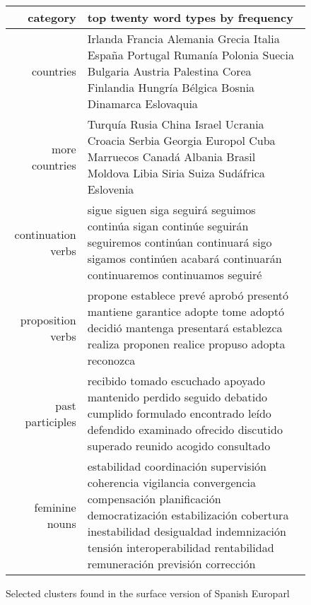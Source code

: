 \begin{figure*}[t!]
  \begin{tabular}{|r|p{10cm}|}
    \hline
    category  & top twenty word types by frequency \\
    \hline
    countries & Irlanda Francia Alemania Grecia Italia España Portugal Rumanía
    Polonia Suecia Bulgaria Austria Palestina Corea Finlandia Hungría Bélgica
    Bosnia Dinamarca Eslovaquia \\
    \hline
    more countries & Turquía Rusia China Israel Ucrania Croacia Serbia Georgia
    Europol Cuba Marruecos Canadá Albania Brasil Moldova Libia Siria Suiza
    Sudáfrica Eslovenia \\
    \hline
    continuation verbs & sigue siguen siga seguirá seguimos continúa
    sigan continúe seguirán seguiremos continúan continuará sigo sigamos
    continúen acabará continuarán continuaremos continuamos seguiré \\
    \hline
    proposition verbs & propone establece prevé aprobó presentó mantiene
    garantice adopte tome adoptó decidió mantenga presentará establezca realiza
    proponen realice propuso adopta reconozca \\
    \hline
    past participles & recibido tomado escuchado apoyado mantenido perdido
    seguido debatido cumplido formulado encontrado leído defendido examinado
    ofrecido discutido superado reunido acogido consultado \\
    \hline
    feminine nouns & estabilidad coordinación supervisión coherencia vigilancia
    convergencia compensación planificación democratización estabilización
    cobertura inestabilidad desigualdad indemnización tensión interoperabilidad
    rentabilidad remuneración previsión corrección \\
    \hline
  \end{tabular}
\caption{Selected clusters found in the surface version of Spanish Europarl}
\label{fig:clusters-europarl-surface}
\end{figure*}

